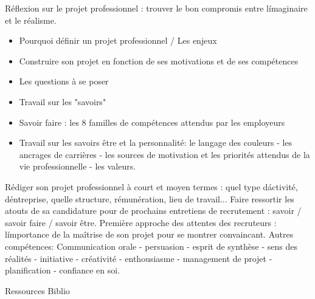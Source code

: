 {
Réflexion sur le projet professionnel : trouver le bon compromis entre
l\'imaginaire et le réalisme.
\begin{itemize} 
\item  Pourquoi définir un projet professionnel / Les enjeux
\item  Construire son projet en fonction de ses motivations et de ses
compétences
\item  Les questions à se poser
\item  Travail sur les "savoirs"
\item  Savoir faire : les 8 familles de compétences attendus par les employeurs
\item  Travail sur les savoirs être et la personnalité: le langage des couleurs - les
ancrages de carrières - les sources de motivation et les priorités attendus
de la vie professionnelle - les valeurs.
\end{itemize} 
} 
{} 
{\begin{itemize} 
  \ObjItem Rédiger son projet professionnel à court et moyen termes : quel type d\'activité, d\'entreprise, quelle structure, rémunération, lieu de travail...
  \ObjItem Faire ressortir les atouts de sa candidature pour de prochains entretiens de recrutement : savoir / savoir faire / savoir être.
  \ObjItem Première approche des attentes des recruteurs : l\'importance de la maîtrise de son projet pour se montrer convaincant.
  \ObjItem Autres compétences: Communication orale - persuasion - esprit de synthèse - sens des réalités - initiative - créativité - enthousiasme - management de projet - planification - confiance en soi.
\end{itemize} 
} 
{Ressources} 
{Biblio} 
 
\vfill

